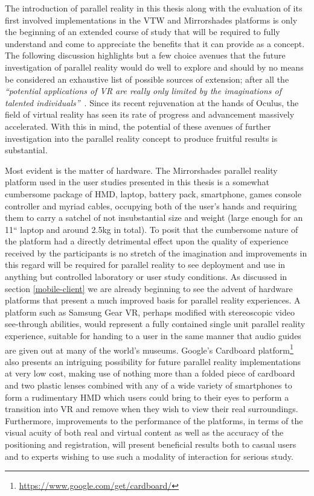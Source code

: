 The introduction of parallel reality in this thesis along with the evaluation of its first involved implementations in the VTW and Mirrorshades platforms is only the beginning of an extended course of study that will be required to fully understand and come to appreciate the benefits that it can provide as a concept. The following discussion highlights but a few choice avenues that the future investigation of parallel reality would do well to explore and should by no means be considered an exhaustive list of possible sources of extension; after all the \textit{``potential applications of VR are really only limited by the imaginations of talented individuals''}~\cite{Giuseppe2014a}. Since its recent rejuvenation at the hands of Oculus, the field of virtual reality has seen its rate of progress and advancement massively accelerated. With this in mind, the potential of these avenues of further investigation into the parallel reality concept to produce fruitful results is substantial.

Most evident is the matter of hardware. The Mirrorshades parallel reality platform used in the user studies presented in this thesis is a somewhat cumbersome package of HMD, laptop, battery pack, smartphone, games console controller and myriad cables, occupying both of the user's hands and requiring them to carry a satchel of not insubstantial size and weight (large enough for an 11`` laptop and around 2.5kg in total). To posit that the cumbersome nature of the platform had a directly detrimental effect upon the quality of experience received by the participants is no stretch of the imagination and improvements in this regard will be required for parallel reality to see deployment and use in anything but controlled laboratory or user study conditions. As discussed in section \ref{mobile-client} we are already beginning to see the advent of hardware platforms that present a much improved basis for parallel reality experiences. A platform such as Samsung Gear VR, perhaps modified with stereoscopic video see-through abilities, would represent a fully contained single unit parallel reality experience, suitable for handing to a user in the same manner that audio guides are given out at many of the world's museums. Google's Cardboard platform\footnote{\url{https://www.google.com/get/cardboard/}} also presents an intriguing possibility for future parallel reality implementations at very low cost, making use of nothing more than a folded piece of cardboard and two plastic lenses combined with any of a wide variety of smartphones to form a rudimentary HMD which users could bring to their eyes to perform a transition into VR and remove when they wish to view their real surroundings. Furthermore, improvements to the performance of the platforms, in terms of the visual acuity of both real and virtual content as well as the accuracy of the positioning and registration, will present beneficial results both to casual users and to experts wishing to use such a modality of interaction for serious study. 

